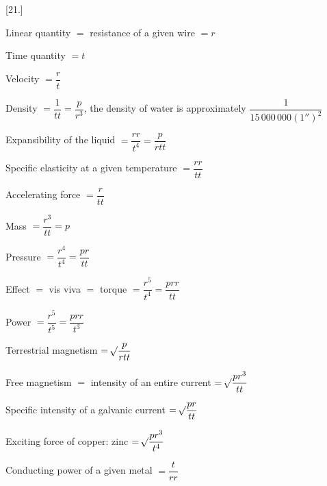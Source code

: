 \begin{center}[21.]\end{center}
\noindent Linear quantity $=$ resistance of a given wire $=r$\par
\noindent Time quantity $=t$\par
\noindent Velocity $=\dfrac rt$\par
\noindent Density $=\dfrac1{tt}=\dfrac p{r^3}$, the density of water is approximately $\dfrac1{15\,000\,000(1'')^2}$\par
\noindent Expansibility of the liquid $=\dfrac{rr}{t^4}=\dfrac p{rtt}$\par
\noindent Specific elasticity at a given temperature $=\dfrac{rr}{tt}$\par
\noindent Accelerating force $=\dfrac r{tt}$\par
\noindent Mass $=\dfrac{r^3}{tt}=p$\par
\noindent Pressure $=\dfrac{r^4}{t^4}=\dfrac{pr}{tt}$\par
\noindent Effect $=$ vis viva $=$ torque $=\dfrac{r^5}{t^4}=\dfrac{prr}{tt}$\par
\noindent Power $=\dfrac{r^5}{t^5}=\dfrac{prr}{t^3}$\par
\noindent Terrestrial magnetism $=\mathord{{}^{}\!\surd}\dfrac p{rtt}$\par
\noindent Free magnetism $=$ intensity of an entire current $=\mathord{{}^{}\!\surd}\dfrac{pr^3}{tt}$\par
\noindent Specific intensity of a galvanic current $=\mathord{{}^{}\!\surd}\dfrac{pr}{tt}$\par
\noindent Exciting force of copper: zinc $=\mathord{{}^{}\!\surd}\dfrac{pr^3}{t^4}$\par
\noindent Conducting power of a given metal $=\dfrac t{rr}$\par

